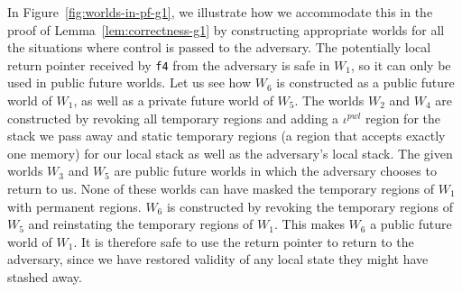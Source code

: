 \documentclass[format=acmsmall, review=false, screen=true]{acmart}
\renewcommand{\figurename}{Figure}
\newcommand{\var}[1]{\mathit{#1}}
\newcommand{\pwl}{\var{pwl}}
\newenvironment{toplas}
    {\color{OliveGreen}
          
    }{}
\begin{document}
\begin{toplas}
In \figurename~\ref{fig:worlds-in-pf-g1}, we illustrate how we accommodate this in
the proof of Lemma~\ref{lem:correctness-g1} by constructing appropriate worlds
for all the situations where control is passed to the adversary. The potentially
local return pointer received by \texttt{\footnotesize{f4}} from the adversary
is safe in $W_1$, so it can only be used in public future worlds. Let us see how
$W_6$ is constructed as a public future world of $W_1$, as well as a private
future world of $W_5$. The worlds $W_2$ and $W_4$ are constructed by revoking
all temporary regions and adding a $\iota^\pwl$ region for the stack we pass
away and static temporary regions (a region that accepts exactly one memory) for
our local stack as well as the adversary's local stack. The given worlds $W_3$
and $W_5$ are public future worlds in which the adversary chooses to return to
us. None of these worlds can have masked the temporary regions of $W_1$ with
permanent regions. $W_6$ is constructed by revoking the temporary regions of
$W_5$ and reinstating the temporary regions of $W_1$. This makes $W_6$ a public
future world of $W_1$. It is therefore safe to use the return pointer to return
to the adversary, since we have restored validity of any local state they might
have stashed away.
\end{toplas}
\end{document}
